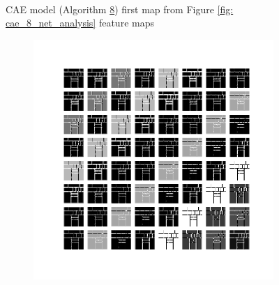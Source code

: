 \begin{figure}
\begin{subfigure}[b]{0.40\linewidth}
    \end{subfigure}
    \\[-0.5cm]
    \caption{CAE model (Algorithm \hyperref[tab: app_evalalgorithms]{8}) first map from Figure \ref{fig: cae_8_net_analysis} feature maps}
    \label{fig: cae_8_feature_maps_1}
\end{figure}

\begin{figure}
    \centering
    \begin{subfigure}[b]{0.4\linewidth}
        \includegraphics[width=\linewidth]{images/cae_online_lstm/caelstm_section_cae_training_house_10000_model_feature_maps_map_1_0_3.png}
    \end{subfigure}
    \hfill
    \begin{subfigure}[b]{0.4\linewidth}

\end{subfigure}
\end{figure}
